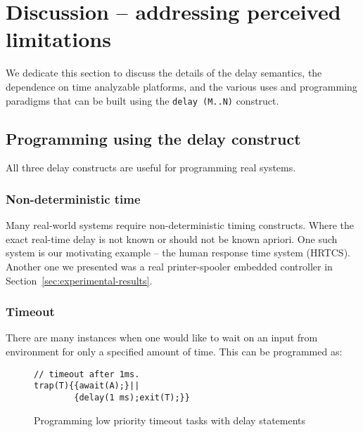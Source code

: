 \section{Discussion -- addressing perceived limitations}
\label{sec:disc-perc-limit}

We dedicate this section to discuss the details of the delay semantics,
the dependence on time analyzable platforms, and the various uses and
programming paradigms that can be built using the \texttt{delay (M..N)}
construct.

\subsection{Programming using the delay construct}
\label{sec:progr-using-delay}

All three delay constructs are useful for programming real systems. %

\subsubsection{Non-deterministic time}
\label{sec:non-determ-time}

Many real-world systems require non-deterministic timing
constructs. Where the exact real-time delay is not known or should not
be known apriori. One such system is our motivating example -- the human
response time system (HRTCS). Another one we presented was a real
printer-spooler embedded controller in
Section~\ref{sec:experimental-results}.

\subsubsection{Timeout}
\label{sec:timeout}

There are many instances when one would like to wait on an input from
environment for only a specified amount of time. This can be programmed
as:

\begin{figure}[h!]
  \centering
    \begin{minipage}[b]{\linewidth}
\begin{verbatim}
// timeout after 1ms.
trap(T){{await(A);}||
        {delay(1 ms);exit(T);}}
\end{verbatim}
    \end{minipage}
  \caption{Programming low priority timeout tasks with delay statements}
  \label{fig:timeout}
\end{figure}

